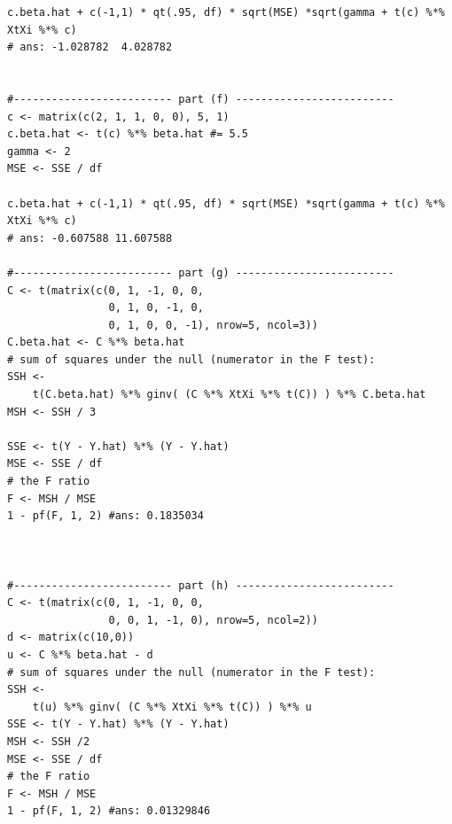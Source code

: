 \documentclass[paper=a4, fontsize=11pt]{scrartcl} %
\begin{document}
\begin{lstlisting}[basicstyle=\ttfamily\small\bfseries]
c.beta.hat + c(-1,1) * qt(.95, df) * sqrt(MSE) *sqrt(gamma + t(c) %*% XtXi %*% c)
# ans: -1.028782  4.028782


#------------------------- part (f) -------------------------
c <- matrix(c(2, 1, 1, 0, 0), 5, 1)
c.beta.hat <- t(c) %*% beta.hat #= 5.5
gamma <- 2
MSE <- SSE / df

c.beta.hat + c(-1,1) * qt(.95, df) * sqrt(MSE) *sqrt(gamma + t(c) %*% XtXi %*% c)
# ans: -0.607588 11.607588

#------------------------- part (g) -------------------------
C <- t(matrix(c(0, 1, -1, 0, 0,
                0, 1, 0, -1, 0,
                0, 1, 0, 0, -1), nrow=5, ncol=3))
C.beta.hat <- C %*% beta.hat
# sum of squares under the null (numerator in the F test):
SSH <-
    t(C.beta.hat) %*% ginv( (C %*% XtXi %*% t(C)) ) %*% C.beta.hat
MSH <- SSH / 3

SSE <- t(Y - Y.hat) %*% (Y - Y.hat)
MSE <- SSE / df
# the F ratio
F <- MSH / MSE
1 - pf(F, 1, 2) #ans: 0.1835034



#------------------------- part (h) -------------------------
C <- t(matrix(c(0, 1, -1, 0, 0,
                0, 0, 1, -1, 0), nrow=5, ncol=2))
d <- matrix(c(10,0))
u <- C %*% beta.hat - d
# sum of squares under the null (numerator in the F test):
SSH <-
    t(u) %*% ginv( (C %*% XtXi %*% t(C)) ) %*% u
SSE <- t(Y - Y.hat) %*% (Y - Y.hat)
MSH <- SSH /2 
MSE <- SSE / df
# the F ratio
F <- MSH / MSE
1 - pf(F, 1, 2) #ans: 0.01329846
\end{lstlisting}

\pagebreak
\end{document}
